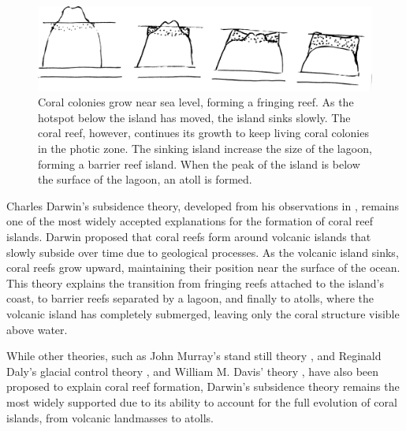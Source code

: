 \begin{figure}[ht]
    \centering
    \includegraphics[width = \linewidth]{other_images/Drawings/Darwin_corals.jpg} %
    \caption{Coral colonies grow near sea level, forming a fringing reef. As the hotspot below the island has moved, the island sinks slowly. The coral reef, however, continues its growth to keep living coral colonies in the photic zone. The sinking island increase the size of the lagoon, forming a barrier reef island. When the peak of the island is below the surface of the lagoon, an atoll is formed. }
    \label{fig:coral-island_reef-growth}
\end{figure}
% 
Charles Darwin's subsidence theory, developed from his observations in \citep{Darwin1842}, remains one of the most widely accepted explanations for the formation of coral reef islands. Darwin proposed that coral reefs form around volcanic islands that slowly subside over time due to geological processes. As the volcanic island sinks, coral reefs grow upward, maintaining their position near the surface of the ocean. This theory explains the transition from fringing reefs attached to the island's coast, to barrier reefs separated by a lagoon, and finally to atolls, where the volcanic island has completely submerged, leaving only the coral structure visible above water.

While other theories, such as John Murray's stand still theory \cite{Murray1880}, and Reginald Daly's glacial control theory \cite{Daly1915}, and William M. Davis' theory \cite{Davis1928}, have also been proposed to explain coral reef formation, Darwin's subsidence theory remains the most widely supported due to its ability to account for the full evolution of coral islands, from volcanic landmasses to atolls. 

